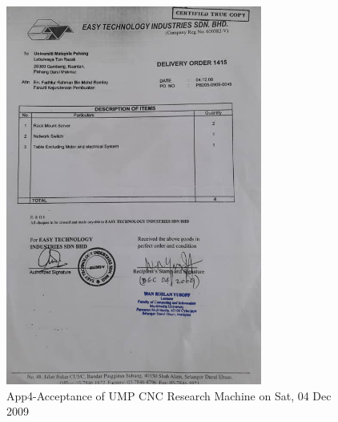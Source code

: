 \begin{figure}[htbp]
	\begin{center}
		\includegraphics[width=0.75\textwidth]{./07-images/img-Ch4App/Received-Delivery-of-UMP-CNC-Research-Machine.jpg}
		\caption{App4-Acceptance of UMP CNC Research Machine on Sat, 04 Dec 2009}
		\label{fig:App4-Received-Delivery-of-UMP-CNC-Research-Machine.jpg}
	\end{center}
\end{figure}


